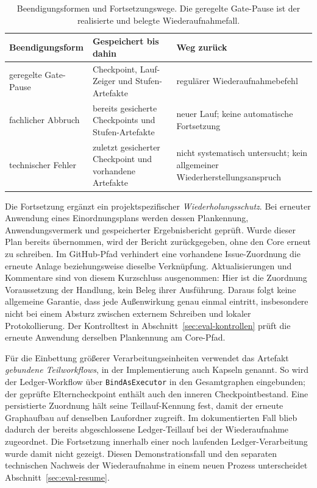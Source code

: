 \begin{table}[htbp]
  \centering
  \small
  \begin{tabular}{p{}p{}p{}}
    \hline
    \textbf{Beendigungsform} & \textbf{Gespeichert bis dahin} & \textbf{Weg zurück} \\
    \hline
    geregelte Gate-Pause & Checkpoint, Lauf-Zeiger und Stufen-Artefakte & regulärer Wiederaufnahmebefehl \\
    fachlicher Abbruch & bereits gesicherte Checkpoints und Stufen-Artefakte & neuer Lauf; keine automatische Fortsetzung \\
    technischer Fehler & zuletzt gesicherter Checkpoint und vorhandene Artefakte & nicht systematisch untersucht; kein allgemeiner Wiederherstellungsanspruch \\
    \hline
  \end{tabular}
  \caption[Beendigungsformen und Fortsetzungswege]{Beendigungsformen und Fortsetzungswege. Die geregelte
    Gate-Pause ist der realisierte und belegte Wiederaufnahmefall.}
  \label{tab:beendigungsformen}
\end{table}

Die Fortsetzung ergänzt ein projektspezifischer
\emph{Wiederholungsschutz}. Bei erneuter Anwendung eines
Einordnungsplans werden dessen Plankennung, Anwendungsvermerk und
gespeicherter Ergebnisbericht geprüft. Wurde dieser Plan bereits
übernommen, wird der Bericht zurückgegeben, ohne den Core erneut zu
schreiben. Im GitHub-Pfad verhindert eine vorhandene Issue-Zuordnung
die erneute Anlage beziehungsweise dieselbe Verknüpfung. Aktualisierungen
und Kommentare sind von diesem Kurzschluss ausgenommen: Hier ist die
Zuordnung Voraussetzung der Handlung, kein Beleg ihrer Ausführung.
Daraus folgt keine allgemeine Garantie, dass jede Außenwirkung
genau einmal eintritt, insbesondere nicht bei einem Absturz zwischen externem
Schreiben und lokaler Protokollierung. Der Kontrolltest in
Abschnitt~\ref{sec:eval-kontrollen} prüft die erneute Anwendung
derselben Plankennung am Core-Pfad.

Für die Einbettung größerer Verarbeitungseinheiten verwendet das
Artefakt \emph{gebundene Teilworkflows}, in der Implementierung auch
Kapseln genannt. So wird der Ledger-Workflow über
\texttt{BindAsExecutor} in den Gesamtgraphen eingebunden; der geprüfte
Elterncheckpoint enthält auch den inneren Checkpointbestand. Eine
persistierte Zuordnung hält seine Teillauf-Kennung fest, damit der
erneute Graphaufbau auf denselben Laufordner zugreift. Im dokumentierten
Fall blieb dadurch der bereits abgeschlossene Ledger-Teillauf bei der
Wiederaufnahme zugeordnet. Die Fortsetzung innerhalb einer noch
laufenden Ledger-Verarbeitung wurde damit nicht gezeigt. Diesen
Demonstrationsfall und den separaten technischen Nachweis der
Wiederaufnahme in einem neuen Prozess unterscheidet
Abschnitt~\ref{sec:eval-resume}.

